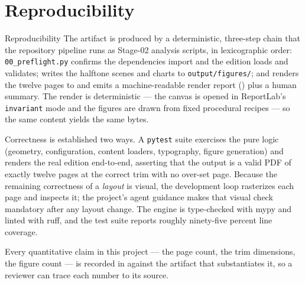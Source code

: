 \documentclass[
  ignorenonframetext,
]{beamer}
\author{\texorpdfstring{}{}}
\date{}
\begin{document}
\section{Reproducibility}\label{reproducibility}

\begin{frame}{Reproducibility}
The artifact is produced by a deterministic, three-step chain that the
repository pipeline runs as Stage-02 analysis scripts, in lexicographic
order: \texttt{00\_preflight.py} confirms the dependencies import and
the edition loads and validates; 
writes the halftone scenes and charts to \texttt{output/figures/}; and
 renders the twelve pages to
 and emits a machine-readable
render report () plus a human
summary. The render is deterministic --- the canvas is opened in
ReportLab's \texttt{invariant} mode and the figures are drawn from fixed
procedural recipes --- so the same content yields the same bytes.

Correctness is established two ways. A \texttt{pytest} suite exercises
the pure logic (geometry, configuration, content loaders, typography,
figure generation) and renders the real edition end-to-end, asserting
that the output is a valid PDF of exactly twelve pages at the correct
trim with no over-set page. Because the remaining correctness of a
\emph{layout} is visual, the development loop rasterizes each page and
inspects it; the project's agent guidance makes that visual check
mandatory after any layout change. The engine is type-checked with mypy
and linted with ruff, and the test suite reports roughly ninety-five
percent line coverage.

Every quantitative claim in this project --- the page count, the trim
dimensions, the figure count --- is recorded in
 against the artifact that substantiates
it, so a reviewer can trace each number to its source.
\end{frame}
\end{document}
